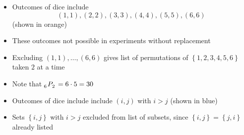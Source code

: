 \documentclass[handout]{beamer}
\theoremstyle{definition}
\newcommand\npr[2]{\tensor[_{#1}]P{_{#2}}}
\begin{document}
\begin{frame}
\begin{itemize}
\item Outcomes of dice include
\[\left(1,1\right),\left(2,2\right),\left(3,3\right),
\left(4,4\right),\left(5,5\right),\left(6,6\right)\]
(shown in {\color{orange}orange})
\item These outcomes not possible in experiments without replacement
\item Excluding $\left(1,1\right),\ldots,\left(6,6\right)$
gives list of permutations of $\left\{1,2,3,4,5,6\right\}$
taken $2$ at a time
\item Note that $\npr{6}{2}=6\cdot 5=30$
\item Outcomes of dice include include $\left(i,j\right)$ with $i>j$
(shown in {\color{blue}blue})
\item Sets $\left\{i,j\right\}$ with $i>j$ excluded
from list of subsets, since
$\left\{i,j\right\}=\left\{j,i\right\}$ already listed
\end{itemize}
\end{frame}
\end{document}
